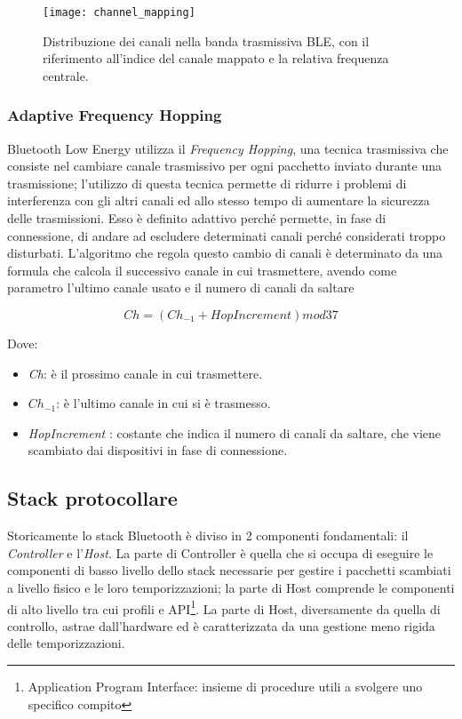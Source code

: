 \begin{figure}[H]
\caption{Distribuzione dei canali nella banda trasmissiva BLE, con il riferimento all'indice del canale mappato e la relativa frequenza centrale.}
\texttt{[image: channel\_mapping]}
\centering
\label{channel_mapping}
\end{figure}




\subsubsection{Adaptive Frequency Hopping}
Bluetooth Low Energy utilizza il \emph{Frequency Hopping}, una tecnica trasmissiva che consiste nel cambiare canale trasmissivo per ogni pacchetto inviato durante una trasmissione; l'utilizzo di questa tecnica permette di ridurre i problemi di interferenza con gli altri canali ed allo stesso tempo di aumentare la sicurezza delle trasmissioni. Esso è definito adattivo perché permette, in fase di connessione, di andare ad escludere determinati canali perché considerati troppo disturbati. L'algoritmo che regola questo cambio di canali è determinato da una formula che calcola il successivo canale in cui trasmettere, avendo come parametro l'ultimo canale usato e il numero di canali da saltare

\[Ch = (Ch_{-1} + HopIncrement)mod 37\]

Dove:
\begin{itemize}
\item[] \emph{Ch}: è il prossimo canale in cui trasmettere.
\item[] $Ch_{-1}$: è l'ultimo canale in cui si è trasmesso.
\item[] \emph{HopIncrement} : costante che indica il numero di canali da saltare, che viene scambiato dai dispositivi in fase di connessione.
\end{itemize}

\subsection{Stack protocollare}
Storicamente lo stack Bluetooth è diviso in 2 componenti fondamentali: il \emph{Controller} e l'\emph{Host}.
La parte di Controller è quella che si occupa di eseguire le componenti di basso livello dello stack necessarie per gestire i pacchetti scambiati a livello fisico e le loro temporizzazioni; la parte di Host comprende le componenti di alto livello tra cui profili e API\footnote{Application Program Interface: insieme di procedure utili a svolgere uno specifico compito}. La parte di Host, diversamente da quella di controllo, astrae dall'hardware ed è caratterizzata da una gestione meno rigida delle temporizzazioni.

